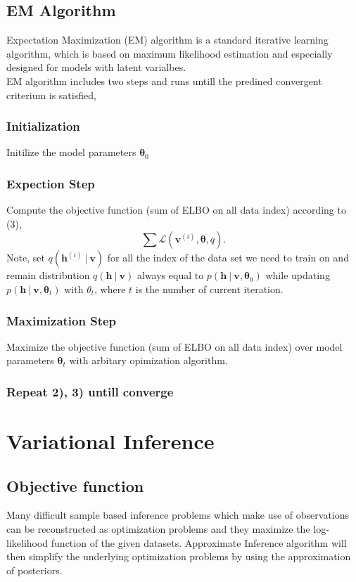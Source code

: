 \documentclass[conference]{IEEEtran}
\begin{document}
\subsection{EM Algorithm}
Expectation Maximization (EM) \cite{moon1996expectation} algorithm is a standard iterative learning algorithm, which is based on maximum likelihood estimation and especially designed for models with latent varialbes. \\

EM algorithm includes two steps and runs untill the predined convergent criterium is satisfied,
\subsubsection{Initialization}
Initilize the model parameters $\boldsymbol{\theta}_0$
\subsubsection{Expection Step}
Compute the objective function (sum of ELBO on all data index) according to (3), 
\begin{equation}
\sum\mathcal{L}(\boldsymbol{v}^{(i)}, \boldsymbol{\theta}, q).
\end{equation}
Note, set $q(\boldsymbol{h}^{(i)}\ |\ \boldsymbol{v})$ for all the index of the data set we need to train on and remain distribution $q(\boldsymbol{h}\ |\ \boldsymbol{v})$ always equal to $p(\boldsymbol{h}\ |\ \boldsymbol{v}, \boldsymbol{\theta}_0)$ while updating $p(\boldsymbol{h}\ |\ \boldsymbol{v}, \boldsymbol{\theta}_t)$ with $\theta_t$, where $t$ is the number of current iteration.
\subsubsection{Maximization Step}
Maximize the objective function (sum of ELBO on all data index) over model parameters $\boldsymbol{\theta}_t$ with arbitary opimization algorithm.
\subsubsection{Repeat 2), 3) untill converge}
\section{Variational Inference}
\subsection{Objective function}
Many difficult sample based inference problems which make use of observations can be reconstructed as optimization problems and they maximize the log-likelihood function of the given datasets.\cite{doersch2016tutorial}\cite{anzai2012pattern} Approximate Inference algorithm will then simplify the underlying optimization problems by using the approximation of posteriors. \\
\end{document}
